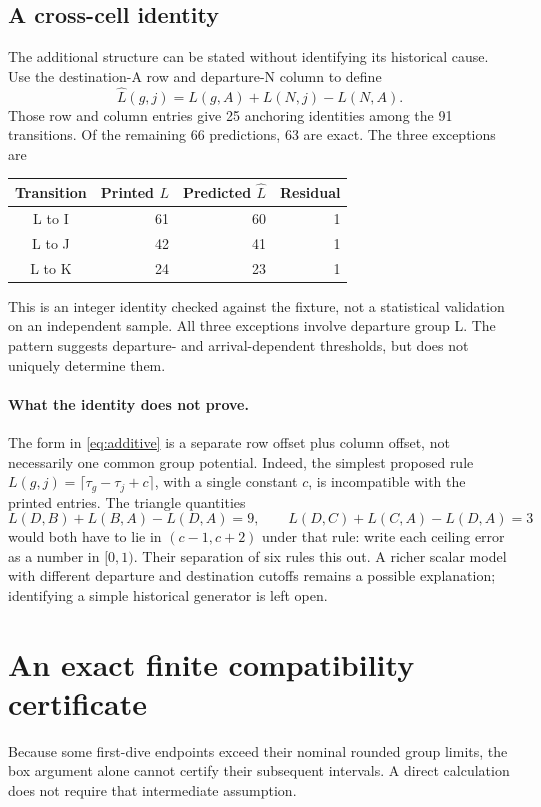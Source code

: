 \documentclass[11pt,letterpaper]{article}
\begin{document}
\subsection{A cross-cell identity}
The additional structure can be stated without identifying its historical cause. Use the destination-A row and departure-N column to define
\begin{equation}
\widehat L(g,j)=L(g,A)+L(N,j)-L(N,A).
\label{eq:additive}
\end{equation}
Those row and column entries give 25 anchoring identities among the 91 transitions. Of the remaining 66 predictions, 63 are exact. The three exceptions are
\begin{center}
\begin{tabular}{@{}crrr@{}}\toprule
Transition&Printed $L$&Predicted $\widehat L$&Residual\\\midrule
L to I&61&60&1\\L to J&42&41&1\\L to K&24&23&1\\\bottomrule
\end{tabular}
\end{center}
This is an integer identity checked against the fixture, not a statistical validation on an independent sample. All three exceptions involve departure group L. The pattern suggests departure- and arrival-dependent thresholds, but does not uniquely determine them.

\paragraph{What the identity does not prove.}
The form in \eqref{eq:additive} is a separate row offset plus column offset, not necessarily one common group potential. Indeed, the simplest proposed rule
$L(g,j)=\lceil\tau_g-\tau_j+c\rceil$, with a single constant $c$, is incompatible with the printed entries. The triangle quantities
\[
L(D,B)+L(B,A)-L(D,A)=9,\qquad
L(D,C)+L(C,A)-L(D,A)=3
\]
would both have to lie in $(c-1,c+2)$ under that rule: write each ceiling error as a number in $[0,1)$. Their separation of six rules this out. A richer scalar model with different departure and destination cutoffs remains a possible explanation; identifying a simple historical generator is left open.

\section{An exact finite compatibility certificate}\label{sec:certificate}
Because some first-dive endpoints exceed their nominal rounded group limits, the box argument alone cannot certify their subsequent intervals. A direct calculation does not require that intermediate assumption.
\end{document}
